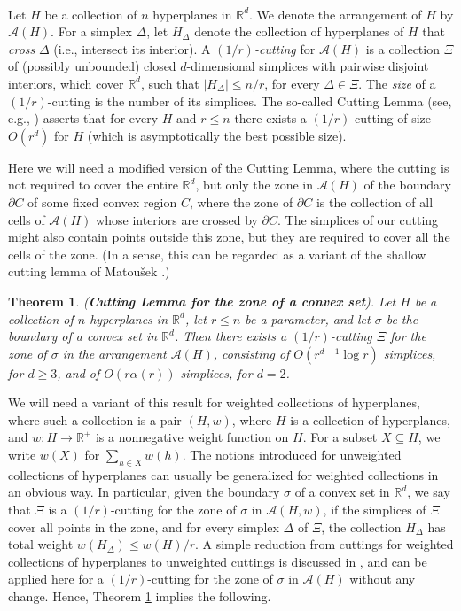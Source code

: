 \documentclass[11pt]{article}
\newtheorem{theorem}{Theorem}[section]
\def\reals{\mathbb R}
\begin{document}
\paragraph{}
Let $H$ be a collection of $n$ hyperplanes in $\reals^d$. We denote the arrangement of $H$ by $\mathcal{A}(H)$. For a simplex $\Delta$, let $H_{\Delta}$ denote the collection of hyperplanes of $H$ that {\em cross} $\Delta$ (i.e., intersect its interior). A $(1/r)$\emph{-cutting} for $\mathcal{A}(H)$ is a collection $\Xi$ of (possibly unbounded) closed $d$-dimensional simplices with pairwise disjoint interiors, which cover $\reals^{d}$, such that $|H_{\Delta}| \leq n/r$, for every $\Delta \in \Xi$. The \emph{size} of a $(1/r)$-cutting is the number of its simplices. The so-called Cutting Lemma (see, e.g., \cite{mat02}) asserts that for every $H$ and $r \leq n$ there exists a $(1/r)$-cutting of size $O(r^{d})$ for $H$ (which is asymptotically the best possible size).

Here we will need a modified version of the Cutting Lemma, where the cutting is not required to cover the entire $\reals^{d}$, but only the zone in $\mathcal{A}(H)$ of the boundary $\partial C$ of some fixed convex region $C$, where the zone of $\partial C$ is the collection of all cells of $\mathcal{A}(H)$ whose interiors are crossed by $\partial C$. The simplices of our cutting might also contain points outside this zone, but they are required to cover all the cells of the zone. (In a sense, this can be regarded as a variant of the shallow cutting lemma of Matou\v{s}ek \cite{mat92b}.)

\begin{theorem} \label{thm_cutting}
\emph{({\bf Cutting Lemma for the zone of a convex set})}. Let $H$ be a collection of $n$ hyperplanes in $\reals^d$, let $r \leq n$ be a parameter, and let $\sigma$ be the boundary of a convex set in $\reals^d$. Then there exists a $(1/r)$-cutting $\Xi$ for the zone of $\sigma$ in the arrangement $\mathcal{A}(H)$, consisting of $O(r^{d-1}\log r)$ simplices, for $d \geq 3$, and of $O(r \alpha(r))$ simplices, for $d = 2$.
\end{theorem}

We will need a variant of this result for weighted collections of hyperplanes, where such a collection is a pair $(H,w)$, where $H$ is a collection of hyperplanes, and $w:H \rightarrow \reals^{+}$ is a nonnegative weight function on $H$. For a subset $X \subseteq H$, we write $w(X)$ for $\sum_{h \in X}w(h)$. The notions introduced for unweighted collections of hyperplanes can usually be generalized for weighted collections in an obvious way. In particular, given the boundary $\sigma$ of a convex set in $\reals^{d}$, we say that $\Xi$ is a $(1/r)$-cutting for the zone of $\sigma$ in $\mathcal{A}(H,w)$, if the simplices of $\Xi$ cover all points in the zone, and for every simplex $\Delta$ of $\Xi$, the collection $H_{\Delta}$ has total weight $w(H_{\Delta}) \leq w(H)/r$. A simple reduction from cuttings for weighted collections of hyperplanes to unweighted cuttings is discussed in \cite{mat91a}, and can be applied here for a $(1/r)$-cutting for the zone of $\sigma$ in $\mathcal{A}(H)$ without any change. Hence, Theorem \ref{thm_cutting} implies the following.
\end{document}
